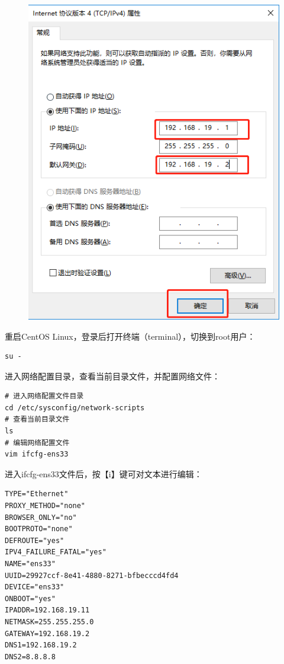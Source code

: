 \documentclass[12pt, openany, oneside]{book}
\begin{document}
\begin{figure}[H]
    \centering
    \includegraphics[scale=0.6]{img/C1/1-4/10.png}
\end{figure}

重启CentOS Linux，登录后打开终端（terminal），切换到root用户：

\vspace{-0.5cm}
\begin{lstlisting}
su -
\end{lstlisting}

进入网络配置目录，查看当前目录文件，并配置网络文件：

\vspace{-0.5cm}
\begin{lstlisting}
# 进入网络配置文件目录
cd /etc/sysconfig/network-scripts
# 查看当前目录文件
ls
# 编辑网络配置文件
vim ifcfg-ens33
\end{lstlisting}

进入ifcfg-ens33文件后，按【i】键可对文本进行编辑：

\vspace{-0.5cm}
\begin{lstlisting}
TYPE="Ethernet"
PROXY_METHOD="none"
BROWSER_ONLY="no"
BOOTPROTO="none"
DEFROUTE="yes"
IPV4_FAILURE_FATAL="yes"
NAME="ens33"
UUID=29927ccf-8e41-4880-8271-bfbecccd4fd4
DEVICE="ens33"
ONBOOT="yes"
IPADDR=192.168.19.11
NETMASK=255.255.255.0
GATEWAY=192.168.19.2
DNS1=192.168.19.2
DNS2=8.8.8.8
\end{lstlisting}
\end{document}
